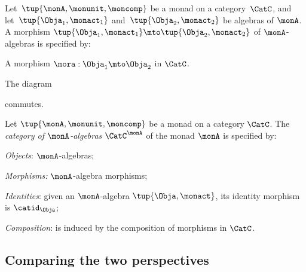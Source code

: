 \begin{ctdefinition}
    \label{def:algebramorphism}
Let~$\tup{\monA, \monunit, \moncomp}$ be a monad on a category~$\CatC$, and let~$\tup{\Obja_1, \monact_1}$ and~$\tup{\Obja_2, \monact_2}$ be algebras of $\monA$. A morphism $\tup{\Obja_1, \monact_1} \mto \tup{\Obja_2, \monact_2}$ of $\monA$-algebras is specified by: \

\constit
\begin{compactenum}
\item A morphism $\mora : \Obja_1 \mto \Obja_2$ in $\CatC$.
\end{compactenum}
\condit
\begin{compactenum}
\item The diagram
\begin{center}
  \end{center}
commutes. 
\end{compactenum}
\end{ctdefinition}



\begin{ctdefinition}
    \label{def:catofmonadalgebras}
Let $\tup{\monA, \monunit, \moncomp}$ be a monad on a category $\CatC$. The \emph{category of $\monA$-algebras} $\CatC^\monA$ of the monad $\monA$ is specified by:
\begin{compactenum}
\item \emph{Objects}: $\monA$-algebras;
\item \emph{Morphisms:} $\monA$-algebra morphisms;
\item \emph{Identities}: given an $\monA$-algebra $\tup{\Obja, \monact}$, its identity morphism is $\catid_\Obja$;
\item \emph{Composition}: is induced by the composition of morphisms in $\CatC$.
\end{compactenum}
\end{ctdefinition}

\subsection{Comparing the two perspectives}


